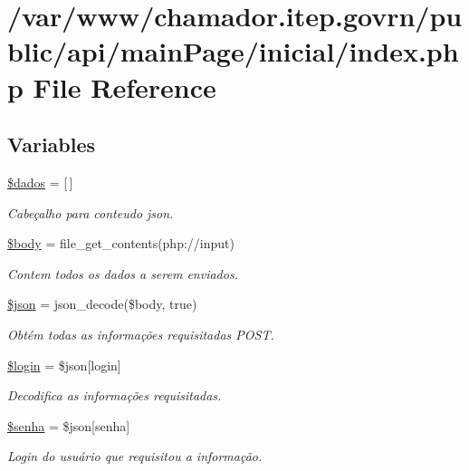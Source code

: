 \hypertarget{main_page_2inicial_2index_8php}{}\section{/var/www/chamador.itep.\+govrn/public/api/main\+Page/inicial/index.php File Reference}
\label{main_page_2inicial_2index_8php}
\subsection*{Variables}
\begin{DoxyCompactItemize}
\item 
\hyperlink{main_page_2inicial_2index_8php_a252370d95039a38fa11afab784725d58}{\$dados} = \mbox{[}$\,$\mbox{]}
\begin{DoxyCompactList}\small\item\em Cabeçalho para conteudo json. \end{DoxyCompactList}\item 
\hyperlink{main_page_2inicial_2index_8php_a26b9f9373f7bb79dfcf8a86dff086b45}{\$body} = file\+\_\+get\+\_\+contents(\textquotesingle{}php\+://input\textquotesingle{})
\begin{DoxyCompactList}\small\item\em Contem todos os dados a serem enviados. \end{DoxyCompactList}\item 
\hyperlink{main_page_2inicial_2index_8php_acedd13b51401130848ce18f4d5c52605}{\$json} = json\+\_\+decode(\$body, true)
\begin{DoxyCompactList}\small\item\em Obtém todas as informações requisitadas P\+O\+ST. \end{DoxyCompactList}\item 
\hyperlink{main_page_2inicial_2index_8php_afc31993e855f9631572adfedcfe6f34b}{\$login} = \$json\mbox{[}\textquotesingle{}login\textquotesingle{}\mbox{]}
\begin{DoxyCompactList}\small\item\em Decodifica as informações requisitadas. \end{DoxyCompactList}\item 
\hyperlink{main_page_2inicial_2index_8php_a3678c8769c9698fd30581c1016c5f475}{\$senha} = \$json\mbox{[}\textquotesingle{}senha\textquotesingle{}\mbox{]}
\begin{DoxyCompactList}\small\item\em Login do usuário que requisitou a informação. \end{DoxyCompactList}\item 

\end{DoxyCompactItemize}
